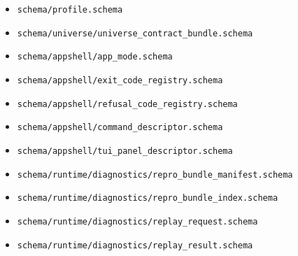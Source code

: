 \documentclass[9pt,a4paper,openany]{book}
\begin{document}
\begin{itemize}
\item \texttt{schema/\allowbreak{}profile.\allowbreak{}schema}
\item \texttt{schema/\allowbreak{}universe/\allowbreak{}universe\_\allowbreak{}contract\_\allowbreak{}bundle.\allowbreak{}schema}
\item \texttt{schema/\allowbreak{}appshell/\allowbreak{}app\_\allowbreak{}mode.\allowbreak{}schema}
\item \texttt{schema/\allowbreak{}appshell/\allowbreak{}exit\_\allowbreak{}code\_\allowbreak{}registry.\allowbreak{}schema}
\item \texttt{schema/\allowbreak{}appshell/\allowbreak{}refusal\_\allowbreak{}code\_\allowbreak{}registry.\allowbreak{}schema}
\item \texttt{schema/\allowbreak{}appshell/\allowbreak{}command\_\allowbreak{}descriptor.\allowbreak{}schema}
\item \texttt{schema/\allowbreak{}appshell/\allowbreak{}tui\_\allowbreak{}panel\_\allowbreak{}descriptor.\allowbreak{}schema}
\item \texttt{schema/\allowbreak{}runtime/\allowbreak{}diagnostics/\allowbreak{}repro\_\allowbreak{}bundle\_\allowbreak{}manifest.\allowbreak{}schema}
\item \texttt{schema/\allowbreak{}runtime/\allowbreak{}diagnostics/\allowbreak{}repro\_\allowbreak{}bundle\_\allowbreak{}index.\allowbreak{}schema}
\item \texttt{schema/\allowbreak{}runtime/\allowbreak{}diagnostics/\allowbreak{}replay\_\allowbreak{}request.\allowbreak{}schema}
\item \texttt{schema/\allowbreak{}runtime/\allowbreak{}diagnostics/\allowbreak{}replay\_\allowbreak{}result.\allowbreak{}schema}
\end{itemize}
\end{document}
